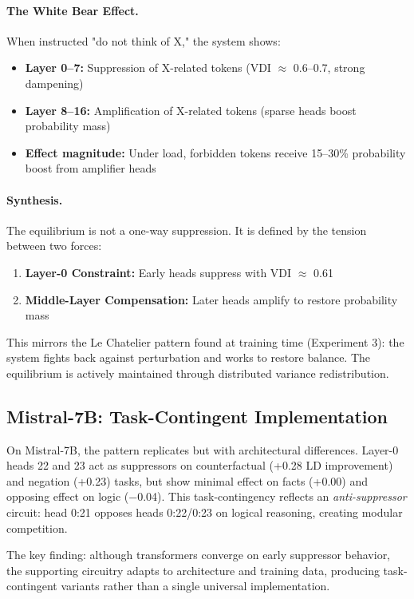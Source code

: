 \paragraph{The White Bear Effect.}
When instructed "do not think of X," the system shows:
\begin{itemize}
\item \textbf{Layer 0--7:} Suppression of X-related tokens (VDI $\approx$ 0.6--0.7, strong dampening)
\item \textbf{Layer 8--16:} Amplification of X-related tokens (sparse heads boost probability mass)
\item \textbf{Effect magnitude:} Under load, forbidden tokens receive 15--30\% probability boost from amplifier heads
\end{itemize}

\paragraph{Synthesis.}
The equilibrium is not a one-way suppression. It is defined by the tension between two forces:
\begin{enumerate}
\item \textbf{Layer-0 Constraint:} Early heads suppress with VDI $\approx$ 0.61
\item \textbf{Middle-Layer Compensation:} Later heads amplify to restore probability mass
\end{enumerate}

This mirrors the Le Chatelier pattern found at training time (Experiment 3): the system fights back against perturbation and works to restore balance. The equilibrium is actively maintained through distributed variance redistribution.

\subsection{Mistral-7B: Task-Contingent Implementation}

On Mistral-7B, the pattern replicates but with architectural differences. Layer-0 heads 22 and 23 act as suppressors on counterfactual (+0.28 LD improvement) and negation (+0.23) tasks, but show minimal effect on facts (+0.00) and opposing effect on logic (−0.04). This task-contingency reflects an \emph{anti-suppressor} circuit: head 0:21 opposes heads 0:22/0:23 on logical reasoning, creating modular competition.

The key finding: although transformers converge on early suppressor behavior, the supporting circuitry adapts to architecture and training data, producing task-contingent variants rather than a single universal implementation.

